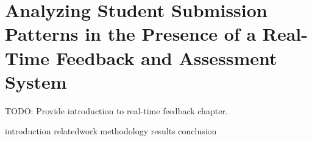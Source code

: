 \chapter{Analyzing Student Submission Patterns in the Presence of a Real-Time
  Feedback and Assessment System}
\label{chap:feedback}

\def\currentprefix{feedback}

TODO: Provide introduction to real-time feedback chapter.

{introduction}
{relatedwork}
{methodology}
{results}
{conclusion}
